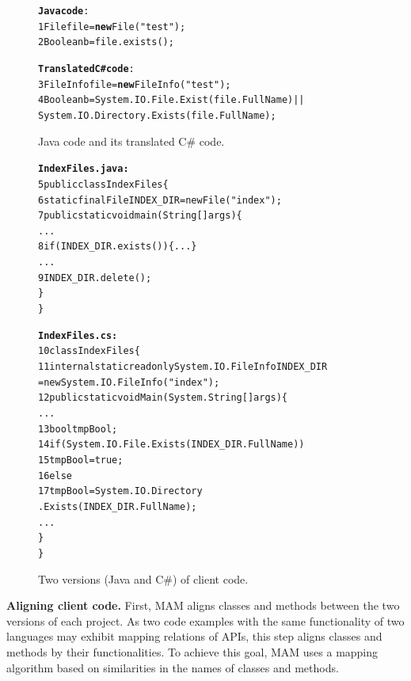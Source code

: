 \begin{figure}[t]
\begin{CodeOut}
\begin{alltt}
\textbf{Java code}:
1  File file = \textbf{new} File("test");
2  Boolean b = file.exists();

\textbf{Translated C\# code}:
3  FileInfo file = \textbf{new} FileInfo("test");
4  Boolean b = System.IO.File.Exist(file.FullName)||
           System.IO.Directory.Exists(file.FullName);
\end{alltt}
\end{CodeOut}\vspace*{-4ex}
\caption{\label{fig:challenge}Java code and its translated C\# code.}\vspace*{-1ex}
\end{figure}
\begin{figure}[t]
\begin{CodeOut}\vspace*{-1ex}
\begin{alltt}
  \textbf{IndexFiles.java:}
5 public class IndexFiles \{
6   static final File INDEX_DIR = new File("index");
7   public static void main(String[] args) \{
      ...
8     if (INDEX_DIR.exists()) \{...\}
      ...
9       INDEX_DIR.delete();
    \}
  \}

  \textbf{IndexFiles.cs:}
10 class IndexFiles\{
11   internal static readonly System.IO.FileInfo INDEX_DIR
          = new System.IO.FileInfo("index");
12   public static void  Main(System.String[] args)\{
      ...
13     bool tmpBool;
14     if (System.IO.File.Exists(INDEX_DIR.FullName))
15       tmpBool = true;
16    else
17       tmpBool = System.IO.Directory
                         .Exists(INDEX_DIR.FullName);
      ...
    \}
 \}
\end{alltt}
\end{CodeOut}\vspace*{-4ex}
\caption{\label{fig:clientcode} Two versions (Java and C\#) of
client code.}\vspace*{-4ex}
\end{figure}

\textbf{Aligning client code.} First, MAM aligns classes and methods
between the two versions of each project. As two code examples with
the same functionality of two languages may exhibit mapping
relations of APIs, this step aligns classes and methods by their
functionalities. To achieve this goal, MAM uses a mapping algorithm
based on similarities in the names of classes and methods.

